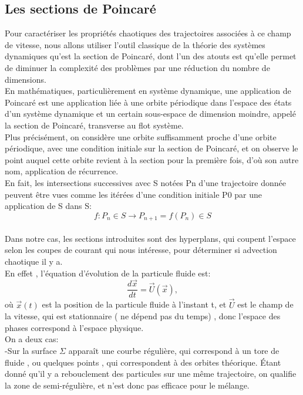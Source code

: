 \documentclass[a4paper,12pt,titlepage]{report}
\begin{document}
\begin{onehalfspace}
\subsection{Les sections de Poincaré}
Pour caractériser les propriétés chaotiques des trajectoires associées à ce champ de vitesse, nous allons utiliser l'outil classique de la théorie des systèmes dynamiques qu'est la section de Poincaré, dont l'un des atouts est qu'elle permet de diminuer la complexité des problèmes par une réduction du nombre de dimensions. 
\\
En mathématiques, particulièrement en système dynamique, une application de Poincaré est une application liée à une orbite périodique dans l’espace des états d’un système dynamique et un certain sous-espace de dimension moindre, appelé la section de Poincaré, transverse au  flot système.\\
 Plus précisément, on considère une orbite suffisamment proche d'une orbite périodique, avec une condition initiale sur la section de Poincaré, et on observe le point auquel cette orbite revient à la section pour la première fois, d'où son autre nom, application de récurrence.
\\
En fait, les intersections successives avec S notées Pn d’une trajectoire donnée peuvent être vues comme les itérées d’une condition initiale P0 par une application de S dans S:
\\
\[f: P_n \in S \to P_{n+1} = f(P_n) \in S \]
\\
Dans notre cas, les sections introduites sont des hyperplans, qui coupent l'espace selon les coupes de courant qui nous intéresse, pour déterminer si advection chaotique il y a.
\\
En effet , l'équation d'évolution de la particule fluide est:
\\
\[ \frac{d\vec{x}}{dt} = \vec{U}(\vec{x}), \]
où $\vec{x}(t)$ est la position de la particule fluide à l'instant t, et $\vec{U}$ est le champ de la vitesse, qui est stationnaire ( ne dépend pas du temps) , donc l'espace des phases correspond à l'espace physique. 
\\
On a deux cas:
\\
-Sur la surface $\Sigma $ apparaît une courbe régulière, qui correspond à un tore de fluide , ou quelques points , qui correspondent à des orbites théorique. Étant donné qu'il y a rebouclement des particules sur une même trajectoire, on qualifie la zone de semi-régulière, et n'est donc pas efficace pour le mélange. 
\\


\end{onehalfspace}
\end{document}
